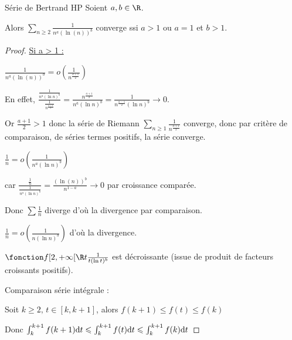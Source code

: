 \begin{proposition}{Série de Bertrand HP}{}
    Soient $a, b \in \R$. 

    Alors $\displaystyle \sum_{n \geqslant 2} \frac 1 {n^a(\ln(n))^b}$ converge ssi $a > 1$ ou $a = 1$ et $b > 1$.

\end{proposition}


\begin{proof}
    \uline{Si a > 1 :}

    \svspace $\displaystyle \frac 1 {n^a(\ln(n))^b} = o \left( \frac 1 {n^{\frac{a + 1} 2}} \right)$

    En effet, $\displaystyle \frac{\frac 1 {n^a (\ln n)^b}}{\frac 1 {n^{\frac{a + 1} 2}}} = \frac{n^{\frac{a + 1} 2}}{n^a(\ln n)^b} = \frac{1}{n^{\frac{a - 1} 2}(\ln n)^b} \longrightarrow 0$.

    Or $\frac{a + 1} 2 > 1 $ donc la série de Riemann $\sum_{n \geqslant 1 } \frac 1 {n^{\frac{a + 1} 2}}$ converge, donc par critère de comparaison,
    de séries termes positifs, la série converge. 



    \svspace $\displaystyle \frac 1 n = o \left( \frac{1 }{n^a (\ln n)^b} \right)$

     car $\displaystyle \frac{\frac 1 n}{\frac 1 {n^a (\ln n)^b}} = \frac{(\ln(n))^b }{n^{1 - a}} \longrightarrow 0$ par croissance comparée.

     Donc $\sum \frac 1 n $ diverge d'où la divergence par comparaison. 


     \svspace $ \frac 1 n = o \left( \frac 1 {n (\ln n)^b} \right)$ d'où la divergence. 


    \svspace $\fonction f {[2, + \infty[} \R t {\frac 1 {t (\ln t)^b}}$ est décroissante (issue de produit
    de facteurs croissants positifs). 

    Comparaison série intégrale : 

    Soit $k \geqslant 2, \, t \in [k, k + 1]$, alors $f(k + 1) \leqslant f(t) \leqslant f(k)$

    Donc $\int_{k}^{k + 1} f(k + 1) \text d t \leqslant \int_{k}^{k + 1} f(t) \text d t \leqslant \int_{k}^{k + 1} f(k) \text d t$


\end{proof}
